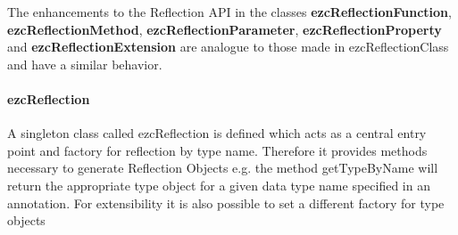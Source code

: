 \documentclass[10pt,final,a4paper,oneside]{article}
\begin{document}
The enhancements to the Reflection API
in the classes
\textbf{ezcReflectionFunction},
\textbf{ezcReflectionMethod},
\textbf{ezcReflectionParameter},
\textbf{ezcReflectionProperty} and
\textbf{ezcReflectionExtension}
are analogue to those made in
ezcReflectionClass
and have a similar behavior.

%
%
%
%


\paragraph{ezcReflection}
A singleton class
called ezcReflection is defined
which acts as a central entry point
and factory for reflection by type name.
Therefore it provides methods necessary
to generate Reflection Objects
e.g. the method getTypeByName
will return the appropriate type object
for a given data type name specified in an annotation.
For extensibility it is also possible
to set a different factory for type objects
\end{document}
